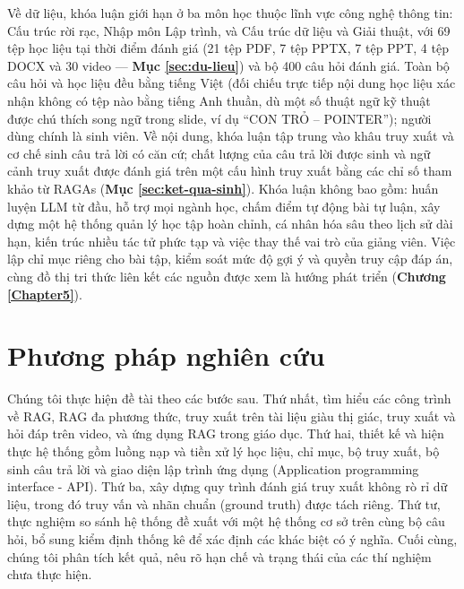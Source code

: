 Về dữ liệu, khóa luận giới hạn ở ba môn học thuộc lĩnh vực công nghệ thông tin: Cấu trúc rời rạc, Nhập môn Lập trình, và Cấu trúc dữ liệu và Giải thuật, với 69 tệp học liệu tại thời điểm đánh giá (21 tệp PDF, 7 tệp PPTX, 7 tệp PPT, 4 tệp DOCX và 30 video — \textbf{Mục \ref{sec:du-lieu}}) và bộ 400 câu hỏi đánh giá. Toàn bộ câu hỏi và học liệu đều bằng tiếng Việt (đối chiếu trực tiếp nội dung học liệu xác nhận không có tệp nào bằng tiếng Anh thuần, dù một số thuật ngữ kỹ thuật được chú thích song ngữ trong slide, ví dụ ``CON TRỎ -- POINTER''); người dùng chính là sinh viên. Về nội dung, khóa luận tập trung vào khâu truy xuất và cơ chế sinh câu trả lời có căn cứ; chất lượng của câu trả lời được sinh và ngữ cảnh truy xuất được đánh giá trên một cấu hình truy xuất bằng các chỉ số tham khảo từ RAGAs (\textbf{Mục \ref{sec:ket-qua-sinh}}). Khóa luận không bao gồm: huấn luyện LLM từ đầu, hỗ trợ mọi ngành học, chấm điểm tự động bài tự luận, xây dựng một hệ thống quản lý học tập hoàn chỉnh, cá nhân hóa sâu theo lịch sử dài hạn, kiến trúc nhiều tác tử phức tạp và việc thay thế vai trò của giảng viên. Việc lập chỉ mục riêng cho bài tập, kiểm soát mức độ gợi ý và quyền truy cập đáp án, cùng đồ thị tri thức liên kết các nguồn được xem là hướng phát triển (\textbf{Chương \ref{Chapter5}}).


\section{Phương pháp nghiên cứu}

Chúng tôi thực hiện đề tài theo các bước sau. Thứ nhất, tìm hiểu các công trình về RAG, RAG đa phương thức, truy xuất trên tài liệu giàu thị giác, truy xuất và hỏi đáp trên video, và ứng dụng RAG trong giáo dục. Thứ hai, thiết kế và hiện thực hệ thống gồm luồng nạp và tiền xử lý học liệu, chỉ mục, bộ truy xuất, bộ sinh câu trả lời và giao diện lập trình ứng dụng (Application programming interface - API). Thứ ba, xây dựng quy trình đánh giá truy xuất không rò rỉ dữ liệu, trong đó truy vấn và nhãn chuẩn (ground truth) được tách riêng. Thứ tư, thực nghiệm so sánh hệ thống đề xuất với một hệ thống cơ sở trên cùng bộ câu hỏi, bổ sung kiểm định thống kê để xác định các khác biệt có ý nghĩa. Cuối cùng, chúng tôi phân tích kết quả, nêu rõ hạn chế và trạng thái của các thí nghiệm chưa thực hiện.

